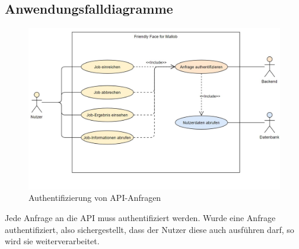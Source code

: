 \pagebreak

\subsection{Anwendungsfalldiagramme}






\begin{figure}[H]
    \centering
    \includegraphics[width=\textwidth]{images-interface/usecasediagrams/Usecasediagram_Authentifizierung_von_Anfragen.jpg}
    \caption{Authentifizierung von \gls{API}-Anfragen}
\end{figure}
Jede Anfrage an die \gls{API} muss authentifiziert werden. Wurde eine Anfrage authentifiziert, also sichergestellt, dass der \gls{Nutzer} diese auch ausführen darf, so wird sie weiterverarbeitet.

\pagebreak

